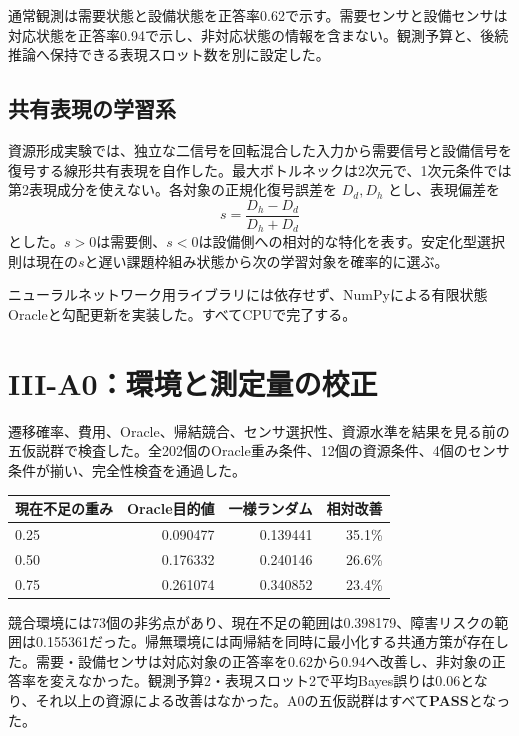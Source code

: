 \documentclass[11pt,a4paper]{ltjsarticle}
\newcommand{\PASS}{\textcolor{pass}{\textbf{PASS}}}
\begin{document}
通常観測は需要状態と設備状態を正答率0.62で示す。需要センサと設備センサは対応状態を正答率0.94で示し、非対応状態の情報を含まない。観測予算と、後続推論へ保持できる表現スロット数を別に設定した。

\subsection{共有表現の学習系}

資源形成実験では、独立な二信号を回転混合した入力から需要信号と設備信号を復号する線形共有表現を自作した。最大ボトルネックは2次元で、1次元条件では第2表現成分を使えない。各対象の正規化復号誤差を $D_d,D_h$ とし、表現偏差を
\begin{equation}
s=\frac{D_h-D_d}{D_h+D_d}
\end{equation}
とした。$s>0$は需要側、$s<0$は設備側への相対的な特化を表す。安定化型選択則は現在の$s$と遅い課題枠組み状態から次の学習対象を確率的に選ぶ。

ニューラルネットワーク用ライブラリには依存せず、NumPyによる有限状態Oracleと勾配更新を実装した。すべてCPUで完了する。

\section{III-A0：環境と測定量の校正}

遷移確率、費用、Oracle、帰結競合、センサ選択性、資源水準を結果を見る前の五仮説群で検査した。全202個のOracle重み条件、12個の資源条件、4個のセンサ条件が揃い、完全性検査を通過した。

\begin{center}\small
\begin{tabular}{lrrr}
\toprule
現在不足の重み & Oracle目的値 & 一様ランダム & 相対改善\\\midrule
0.25 & 0.090477 & 0.139441 & 35.1\%\\
0.50 & 0.176332 & 0.240146 & 26.6\%\\
0.75 & 0.261074 & 0.340852 & 23.4\%\\\bottomrule
\end{tabular}
\end{center}

競合環境には73個の非劣点があり、現在不足の範囲は0.398179、障害リスクの範囲は0.155361だった。帰無環境には両帰結を同時に最小化する共通方策が存在した。需要・設備センサは対応対象の正答率を0.62から0.94へ改善し、非対象の正答率を変えなかった。観測予算2・表現スロット2で平均Bayes誤りは0.06となり、それ以上の資源による改善はなかった。A0の五仮説群はすべて\PASS となった。
\end{document}
